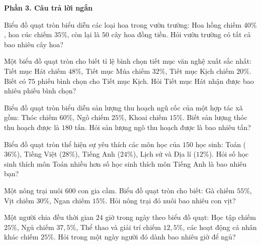 \textbf{Phần 3. Câu trả lời ngắn}

\begin{ex} %
Biểu đồ quạt tròn biểu diễn các loại hoa trong vườn trường: Hoa hồng chiếm $40\%$, hoa cúc chiếm $35\%$, còn lại là $50$ cây hoa đồng tiền. Hỏi vườn trường có tất cả bao nhiêu cây hoa?
\end{ex}

\begin{ex} %
Một biểu đồ quạt tròn cho biết tỉ lệ bình chọn tiết mục văn nghệ xuất sắc nhất: Tiết mục Hát chiếm $48\%$, Tiết mục Múa chiếm $32\%$, Tiết mục Kịch chiếm $20\%$. Biết có $75$ phiếu bình chọn cho Tiết mục Kịch. Hỏi Tiết mục Hát nhận được bao nhiêu phiếu bình chọn?
\end{ex}

\begin{ex} %
Biểu đồ quạt tròn biểu diễn sản lượng thu hoạch ngũ cốc của một hợp tác xã gồm: Thóc chiếm $60\%$, Ngô chiếm $25\%$, Khoai chiếm $15\%$. Biết sản lượng thóc thu hoạch được là $180\text{ tấn}$. Hỏi sản lượng ngô thu hoạch được là bao nhiêu tấn?
\end{ex}

\begin{ex} %
Biểu đồ quạt tròn thể hiện sự yêu thích các môn học của $150$ học sinh: Toán ($36\%$), Tiếng Việt ($28\%$), Tiếng Anh ($24\%$), Lịch sử và Địa lí ($12\%$). Hỏi số học sinh thích môn Toán nhiều hơn số học sinh thích môn Tiếng Anh là bao nhiêu bạn?
\end{ex}

\begin{ex} %
Một nông trại nuôi $600$ con gia cầm. Biểu đồ quạt tròn cho biết: Gà chiếm $55\%$, Vịt chiếm $30\%$, Ngan chiếm $15\%$. Hỏi nông trại đó nuôi bao nhiêu con vịt?
\end{ex}

\begin{ex} %
Một người chia đều thời gian $24$ giờ trong ngày theo biểu đồ quạt: Học tập chiếm $25\%$, Ngủ chiếm $37{,}5\%$, Thể thao và giải trí chiếm $12{,}5\%$, các hoạt động cá nhân khác chiếm $25\%$. Hỏi trong một ngày người đó dành bao nhiêu giờ để ngủ?
\end{ex}

